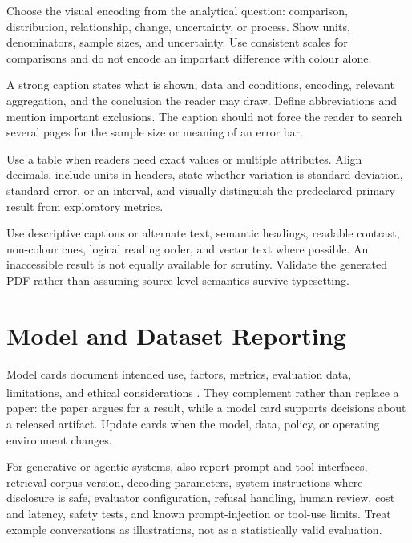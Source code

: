 \begin{tcbitemize}[skin=sectionraster]
\tcbitem[title={A Figure Must Answer a Question},raster multicolumn=3]
Choose the visual encoding from the analytical question: comparison,
distribution, relationship, change, uncertainty, or process.
Show units, denominators, sample sizes, and uncertainty.
Use consistent scales for comparisons and do not encode an important
difference with colour alone.

\tcbitem[title={A Caption Must Stand Alone},raster multicolumn=3]
A strong caption states what is shown, data and conditions, encoding, relevant
aggregation, and the conclusion the reader may draw.
Define abbreviations and mention important exclusions.
The caption should not force the reader to search several pages for the sample
size or meaning of an error bar.

\tcbitem[title={Tables Are for Exact Values},raster multicolumn=3]
Use a table when readers need exact values or multiple attributes.
Align decimals, include units in headers, state whether variation is standard
deviation, standard error, or an interval, and visually distinguish the
predeclared primary result from exploratory metrics.

\tcbitem[title={Accessibility Is Part of Accuracy},raster multicolumn=3]
Use descriptive captions or alternate text, semantic headings, readable
contrast, non-colour cues, logical reading order, and vector text where
possible.
An inaccessible result is not equally available for scrutiny.
Validate the generated PDF rather than assuming source-level semantics survive
typesetting.
\end{tcbitemize}

\section{Model and Dataset Reporting}

Model cards document intended use, factors, metrics, evaluation data,
limitations, and ethical considerations
\textsuperscript{\cite{mitchellModelCardsModel2019}}.
They complement rather than replace a paper: the paper argues for a result,
while a model card supports decisions about a released artifact.
Update cards when the model, data, policy, or operating environment changes.

For generative or agentic systems, also report prompt and tool interfaces,
retrieval corpus version, decoding parameters, system instructions where
disclosure is safe, evaluator configuration, refusal handling, human review,
cost and latency, safety tests, and known prompt-injection or tool-use limits.
Treat example conversations as illustrations, not as a statistically valid
evaluation.

